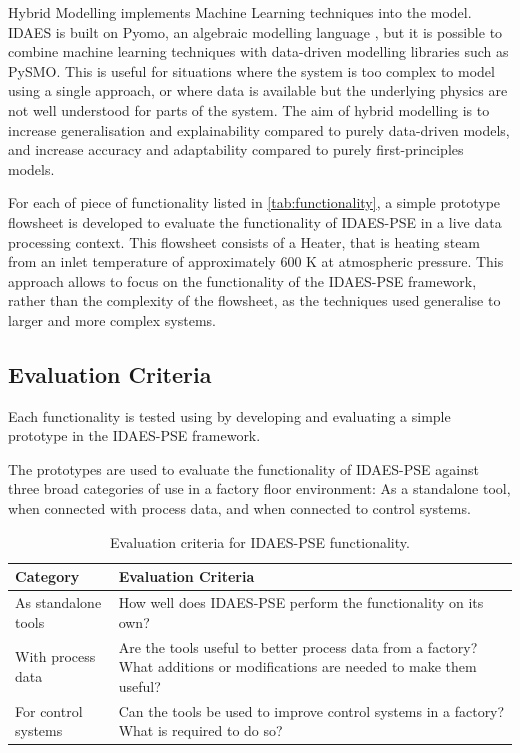 \documentclass[12pt]{article}
\begin{document}
Hybrid Modelling implements Machine Learning techniques into the model. IDAES is built on Pyomo, an algebraic modelling language \cite{bynum2021pyomo}, but it is possible to combine machine learning techniques with data-driven modelling libraries such as PySMO. 
This is useful for situations where the system is too complex to model using a single approach, or where data is available but the underlying physics are not well understood for parts of the system. 
The aim of hybrid modelling is to increase generalisation and explainability compared to purely data-driven models, and increase accuracy and adaptability compared to purely first-principles models.


For each of piece of functionality listed in \cref{tab:functionality}, a simple prototype flowsheet is developed to evaluate the functionality of IDAES-PSE in a live data processing context. This flowsheet consists of a Heater, that is heating steam from an inlet temperature of approximately 600 K at atmospheric pressure. This approach allows to focus on the functionality of the IDAES-PSE framework, rather than the complexity of the flowsheet, as the techniques used generalise to larger and more complex systems.


\subsection{Evaluation Criteria}

Each functionality is tested using by developing and evaluating a simple prototype in the IDAES-PSE framework. 

The prototypes are used to evaluate the functionality of IDAES-PSE against three broad categories of use in a factory floor environment: As a standalone tool, when connected with process data, and when connected to control systems. 

\begin{table}[h]
    \centering
    \begin{tabular}{|l|p{10cm}|}
        \hline
        \textbf{Category} & \textbf{Evaluation Criteria} \\
        \hline
        As standalone tools & How well does IDAES-PSE perform the functionality on its own? \\
        \hline
        With process data & Are the tools useful to better process data from a factory? What additions or modifications are needed to make them useful? \\
        \hline
        For control systems & Can the tools be used to improve control systems in a factory? What  is required to do so? \\
        \hline
    \end{tabular}
    \caption{Evaluation criteria for IDAES-PSE functionality.}
    \label{tab:evaluation_criteria}
\end{table}
\end{document}
